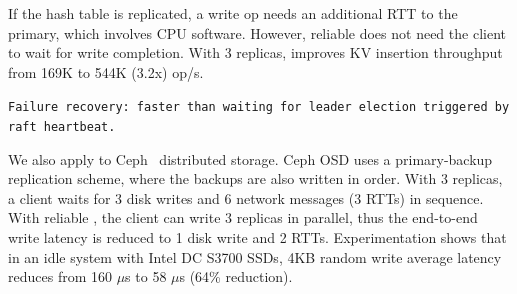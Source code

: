 If the hash table is replicated, a write op needs an additional RTT to the primary, which involves CPU software. However, reliable \sys{} does not need the client to wait for write completion.
With 3 replicas, \sys{} improves KV insertion throughput from 169K to 544K (3.2x) op/s.

\texttt{Failure recovery: faster than waiting for leader election triggered by raft heartbeat.}

We also apply \sys{} to Ceph~\cite{weil2006ceph} distributed storage. Ceph OSD uses a primary-backup replication scheme, where the backups are also written in order. With 3 replicas, a client waits for 3 disk writes and 6 network messages (3 RTTs) in sequence. With reliable \sys{}, the client can write 3 replicas in parallel, thus the end-to-end write latency is reduced to 1 disk write and 2 RTTs. Experimentation shows that in an idle system with Intel DC S3700 SSDs, 4KB random write average latency reduces from 160 $\mu$s to 58 $\mu$s (64\% reduction).






